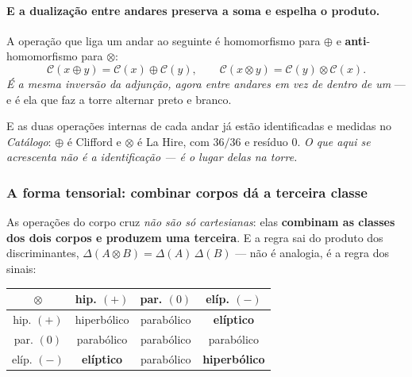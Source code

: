 \documentclass[livro.tex]{subfiles}
\begin{document}

\paragraph{E a dualização entre andares preserva a soma e espelha o produto.} A operação que liga
um andar ao seguinte é homomorfismo para $\oplus$ e \textbf{anti}-homomorfismo para $\otimes$:
\[
  \mathcal C(x\oplus y)=\mathcal C(x)\oplus\mathcal C(y),
  \qquad
  \mathcal C(x\otimes y)=\mathcal C(y)\otimes\mathcal C(x) .
\]
\emph{É a mesma inversão da adjunção, agora entre andares em vez de dentro de um} --- e é ela que
faz a torre alternar preto e branco.


\noindent E as duas operações internas de cada andar já estão identificadas e medidas no
\emph{Catálogo}: $\oplus$ é Clifford e $\otimes$ é La Hire, com $36/36$ e resíduo $0$. \emph{O que
aqui se acrescenta não é a identificação --- é o lugar delas na torre.}

\subsubsection*{A forma tensorial: combinar corpos dá a terceira classe}

As operações do corpo cruz \emph{não são só cartesianas}: elas \textbf{combinam as classes dos dois
corpos e produzem uma terceira}. E a regra sai do produto dos discriminantes,
$\Delta(A\otimes B)=\Delta(A)\,\Delta(B)$ --- não é analogia, é a regra dos sinais:

\begin{center}\small
\begin{tabular}{@{}c|ccc@{}}
\toprule
$\otimes$ & hip. $(+)$ & par. $(0)$ & elíp. $(-)$ \\
\midrule
hip. $(+)$  & hiperbólico & parabólico & \textbf{elíptico} \\
par. $(0)$  & parabólico  & parabólico & parabólico \\
elíp. $(-)$ & \textbf{elíptico} & parabólico & \textbf{hiperbólico} \\
\bottomrule
\end{tabular}
\end{center}
\end{document}
